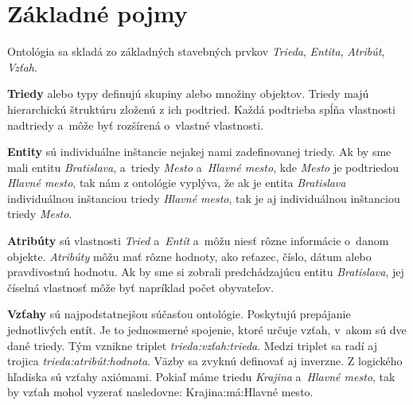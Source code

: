 \documentclass[12pt, a4paper, oneside]{book}
\begin{document}

\section{Základné pojmy}
Ontológia sa skladá zo základných stavebných prvkov \textit{Trieda}, \textit{Entita}, \textit{Atribút}, \textit{Vzťah}. 


\textbf{Triedy} alebo typy definujú skupiny alebo množiny objektov. Triedy majú hierarchickú štruktúru zloženú z ich podtried. Každá podtrieba spĺňa vlastnosti nadtriedy a~môže byť rozšírená o~vlastné vlastnosti.


\textbf{Entity} sú individuálne inštancie nejakej nami zadefinovanej triedy. Ak by sme mali entitu \textit{Bratislava}, a~triedy \textit{Mesto} a~\textit{Hlavné mesto}, kde \textit{Mesto} je podtriedou \textit{Hlavné mesto}, tak nám z ontológie vyplýva, že ak je entita \textit{Bratislava} individuálnou inštanciou triedy \textit{Hlavné mesto}, tak je aj individuálnou inštanciou triedy \textit{Mesto}.



\textbf{Atribúty} sú vlastnosti \textit{Tried} a~\textit{Entít} a~môžu niesť rôzne informácie o~danom objekte. \textit{Atribúty} môžu mať rôzne hodnoty, ako reťazec, číslo, dátum alebo pravdivostnú hodnotu. Ak by sme si zobrali predchádzajúcu entitu \textit{Bratislava}, jej číselná vlastnosť môže byť napríklad počet obyvateľov.


\textbf{Vzťahy} sú najpodstatnejšou súčasťou ontológie. Poskytujú prepájanie jednotlivých entít. Je to jednosmerné spojenie, ktoré určuje vzťah, v~akom sú dve dané triedy. Tým vznikne triplet \textit{trieda:vzťah:trieda}. Medzi triplet sa radí aj trojica \textit{trieda:atribút:hodnota}. Väzby sa zvyknú definovať aj inverzne. Z logického hľadiska sú vzťahy axiómami. Pokiaľ máme triedu \textit{Krajina} a~\textit{Hlavné mesto}, tak by vzťah mohol vyzerať nasledovne: Krajina:má:Hlavné mesto.
\end{document}
